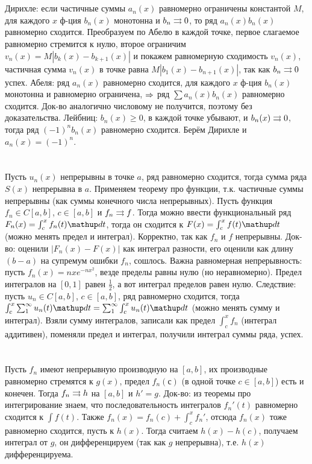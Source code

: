 \section{} %
Дирихле: если частичные суммы $a_n(x)$ равномерно ограничены константой $M$, для каждого $x$ ф-ция $b_n(x)$ монотонна и $b_n \rightrightarrows 0$, то ряд $a_n(x)b_n(x)$ равномерно сходится.
Преобразуем по Абелю в каждой точке, первое слагаемое равномерно стремится к нулю, второе ограничим $v_n(x)=M|b_k(x)-b_{k+1}(x)|$ и покажем равномерную сходимость $v_n(x)$,
частичная сумма $v_n(x)$ в точке равна $M|b_1(x)-b_{n+1}(x)|$, так как $b_n \rightrightarrows 0$ успех.
Абеля: ряд $a_n(x)$ равномерно сходится, для каждого $x$ ф-ция $b_n(x)$ монотонна и равномерно ограничена, $\Rightarrow$ ряд $\sum a_n(x)b_n(x)$ равномерно сходится.
Док-во аналогично числовому не получится, поэтому без доказательства.
Лейбниц: $b_n(x) \ge 0$, в каждой точке убывают, и $b_n(x) \rightrightarrows 0$, тогда ряд $(-1)^nb_n(x)$ равномерно сходится.
Берём Дирихле и $a_n(x)=(-1)^n$.

\section{} %
Пусть $u_n(x)$ непрерывны в точке $a$, ряд равномерно сходится, тогда сумма ряда $S(x)$ непрерывна в $a$.
Применяем теорему про функции, т.к. частичные суммы непрерывны (как суммы конечного числа непрерывных).
Пусть функция $f_n \in C[a, b]$, $c \in [a,b]$ и $f_n \rightrightarrows f$.
Тогда можно ввести функциональный ряд $F_n(x)=\int_c^x f_n(t) \d t$, тогда он сходится к $F(x)=\int_c^x f(t)\d t$ (можно менять предел и интеграл).
Корректно, так как $f_n$ и $f$ непрерывны.
Док-во: оценили $|F_n(x)-F(x)|$ как интеграл разности, его оценили как длину $(b-a)$ на супремум ошибки $f_n$, сошлось.
Важна равномерная непрерывность: пусть $f_n(x)=nxe^{-nx^2}$, везде пределы равны нулю (но неравномерно).
Предел интегралов на $[0,1]$ равен $\frac 1 2$, а вот интеграл пределов равен нулю.
Следствие: пусть $u_n \in C[a, b]$, $c \in [a,b]$, ряд равномерно сходится, тогда $\int_c^x \sum_1^\infty u_n(t) \d t = \sum_1^\infty \int_c^x u_n(t) \d t$ (можно менять сумму и интеграл).
Взяли сумму интегралов, записали как предел $\int_c^x f_n$ (интеграл аддитивен), поменяли предел и интеграл, получили интеграл суммы ряда, успех.

\section{} %
Пусть $f_n$ имеют непрерывную производную на $[a,b]$, их производные равномерно стремятся к $g(x)$, предел $f_n(с)$ (в одной точке $c\in[a,b]$) есть и конечен.
Тогда $f_n \rightrightarrows h$ на $[a,b]$ и $h'=g$.
Док-во: из теоремы про интегрирование знаем, что последовательность интегралов $f_n'(t)$ равномерно сходится к $\int f(t)$.
Также $f_n(x)=f_n(c)+\int_c^x f_n'$, отсюда $f_n(x)$ тоже равномерно сходится, пусть к $h(x)$.
Тогда считаем $h(x)-h(c)$, получаем интеграл от $g$, он дифференцируем (так как $g$ непрерывна), т.е. $h(x)$ дифференцируема.

